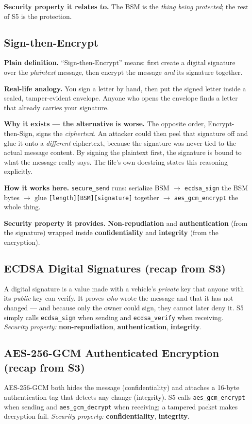\documentclass[11pt,a4paper]{report}
\begin{document}
\textbf{Security property it relates to.} The BSM is the \emph{thing being
protected}; the rest of S5 is the protection.

\subsection{Sign-then-Encrypt}
\textbf{Plain definition.} ``Sign-then-Encrypt'' means: first create a digital
signature over the \emph{plaintext} message, then encrypt the message
\emph{and} its signature together.

\textbf{Real-life analogy.} You sign a letter by hand, then put the signed letter
inside a sealed, tamper-evident envelope. Anyone who opens the envelope finds a
letter that already carries your signature.

\textbf{Why it exists --- the alternative is worse.} The opposite order,
Encrypt-then-Sign, signs the \emph{ciphertext}. An attacker could then peel that
signature off and glue it onto a \emph{different} ciphertext, because the
signature was never tied to the actual message content. By signing the plaintext
first, the signature is bound to what the message really says. The file's own
docstring states this reasoning explicitly.

\textbf{How it works here.} \texttt{secure\_send} runs: serialize BSM
$\rightarrow$ \texttt{ecdsa\_sign} the BSM bytes $\rightarrow$ glue
\texttt{[length][BSM][signature]} together $\rightarrow$ \texttt{aes\_gcm\_encrypt}
the whole thing.

\textbf{Security property it provides.} \textbf{Non-repudiation} and
\textbf{authentication} (from the signature) wrapped inside
\textbf{confidentiality} and \textbf{integrity} (from the encryption).

\subsection{ECDSA Digital Signatures (recap from S3)}
A digital signature is a value made with a vehicle's \emph{private} key that
anyone with its \emph{public} key can verify. It proves \emph{who} wrote the
message and that it has not changed --- and because only the owner could sign,
they cannot later deny it. S5 simply calls \texttt{ecdsa\_sign} when sending and
\texttt{ecdsa\_verify} when receiving. \emph{Security property:}
\textbf{non-repudiation}, \textbf{authentication}, \textbf{integrity}.

\subsection{AES-256-GCM Authenticated Encryption (recap from S3)}
AES-256-GCM both hides the message (confidentiality) and attaches a 16-byte
authentication tag that detects any change (integrity). S5 calls
\texttt{aes\_gcm\_encrypt} when sending and \texttt{aes\_gcm\_decrypt} when
receiving; a tampered packet makes decryption fail. \emph{Security property:}
\textbf{confidentiality}, \textbf{integrity}.
\end{document}
